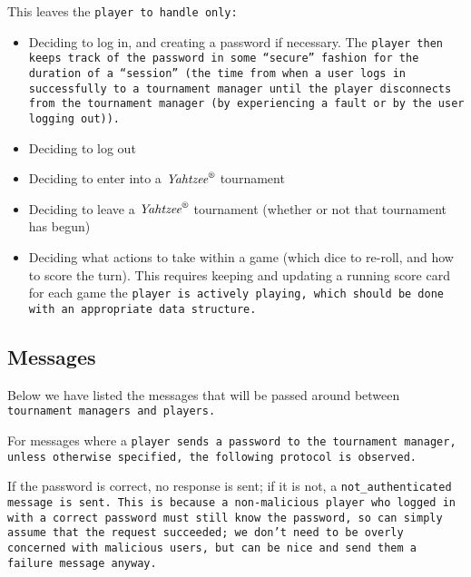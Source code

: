 \documentclass[12pt,letterpaper]{article}
\newcommand{\tm}{\tt{tournament manager}}
\newcommand{\pl}{\tt{player}}
\newcommand{\yahtz}{$\text{\emph{Yahtzee}}^\text{\textregistered}$}
\begin{document}
This leaves the \pl{} to handle only:
\begin{itemize}
\item Deciding to log in, and creating a password if necessary.  The \pl{} then keeps track of the password in some ``secure'' fashion for the duration of a ``session'' (the time from when a user logs in successfully to a \tm{} until the \pl{} disconnects from the \tm{} (by experiencing a fault or by the user logging out)).

\item Deciding to log out

\item Deciding to enter into a \yahtz{} tournament

\item Deciding to leave a \yahtz{} tournament (whether or not that tournament has begun)

\item Deciding what actions to take within a game (which dice to re-roll, and how to score the turn).  This requires keeping and updating a running score card for each game the \pl{} is actively playing, which should be done with an appropriate data structure.
\end{itemize}


\subsection*{Messages}
Below we have listed the messages that will be passed around between \tm s and \pl s.  

For messages where a \pl{} sends a password to the \tm, unless otherwise specified, the following protocol is observed.

If the password is correct, no response is sent; if it is not, a \tt{not\_authenticated} message is sent.  This is because a non-malicious \pl{} who logged in with a correct password must still know the password, so can simply assume that the request succeeded; we don't need to be overly concerned with malicious users, but can be nice and send them a failure message anyway.
\end{document}

